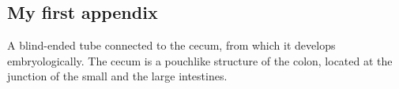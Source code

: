
\chapter{ }

\section{My first appendix}
\label{app: }

A blind-ended tube connected to the cecum, from which it develops embryologically. The cecum is a pouchlike structure of the colon, located at the junction of the small and the large intestines.
